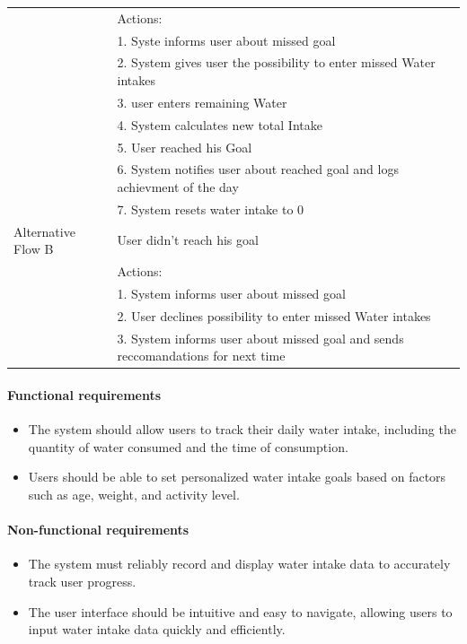 \documentclass{article}
\begin{document}
\begin{table}[h!]
\begin{tabularx}{\textwidth}{|>{\raggedright\arraybackslash}p{}|X|}
                         & Actions: \\
                         & 1. Syste informs user about missed goal\\
                         & 2. System gives user the possibility to enter missed Water intakes \\ 
                         & 3. user enters remaining Water\\
                         & 4. System calculates new total Intake\\
                         & 5. User reached his Goal\\ 
                         & 6. System notifies user about reached goal and logs achievment of the day\\
                         & 7. System resets water intake to 0 \\ \hline
        Alternative Flow B & User didn't reach his goal\\
                         & Actions: \\
                         & 1. System informs user about missed goal \\
                         & 2. User declines possibility to enter missed Water intakes\\
                         & 3. System informs user about missed goal and sends reccomandations for next time \\ \hline
    \end{tabularx}
\end{table}
	
\paragraph{Functional requirements}
		\begin{itemize}
			\item  The system should allow users to track their daily water intake, including the quantity of water consumed and the time of consumption.
			\item  Users should be able to set personalized water intake goals based on factors such as age, weight, and activity level.
		\end{itemize}
		
	\paragraph{Non-functional requirements}
		\begin{itemize}
			\item The system must reliably record and display water intake data to accurately track user progress.
			\item The user interface should be intuitive and easy to navigate, allowing users to input water intake data quickly and efficiently.
		\end{itemize}
\end{document}
